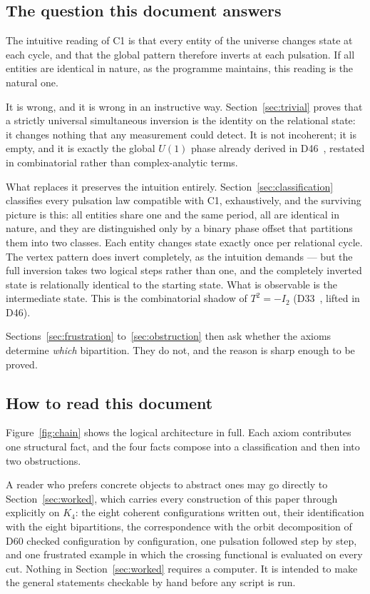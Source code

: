 \documentclass[11pt,a4paper]{article}
\def\mathrm#1{#1}%
\newcommand{\Kfour}{K_4}
\begin{document}
\subsection{The question this document answers}

The intuitive reading of C1 is that every entity of the universe changes state at each cycle, and that the global pattern therefore inverts at each pulsation. If all entities are identical in nature, as the programme maintains, this reading is the natural one.

It is wrong, and it is wrong in an instructive way. Section~\ref{sec:trivial} proves that a strictly universal simultaneous inversion is the identity on the relational state: it changes nothing that any measurement could detect. It is not incoherent; it is empty, and it is exactly the global $\mathrm{U}(1)$ phase already derived in D46~\citep{D46}, restated in combinatorial rather than complex-analytic terms.

What replaces it preserves the intuition entirely. Section~\ref{sec:classification} classifies every pulsation law compatible with C1, exhaustively, and the surviving picture is this: all entities share one and the same period, all are identical in nature, and they are distinguished only by a binary phase offset that partitions them into two classes. Each entity changes state exactly once per relational cycle. The vertex pattern does invert completely, as the intuition demands --- but the full inversion takes two logical steps rather than one, and the completely inverted state is relationally identical to the starting state. What is observable is the intermediate state. This is the combinatorial shadow of $T^2=-I_2$ (D33~\citep{D33}, lifted in D46).

Sections~\ref{sec:frustration} to~\ref{sec:obstruction} then ask whether the axioms determine \emph{which} bipartition. They do not, and the reason is sharp enough to be proved.

\subsection{How to read this document}

Figure~\ref{fig:chain} shows the logical architecture in full. Each axiom contributes one structural fact, and the four facts compose into a classification and then into two obstructions.

A reader who prefers concrete objects to abstract ones may go directly to Section~\ref{sec:worked}, which carries every construction of this paper through explicitly on $\Kfour$: the eight coherent configurations written out, their identification with the eight bipartitions, the correspondence with the orbit decomposition of D60 checked configuration by configuration, one pulsation followed step by step, and one frustrated example in which the crossing functional is evaluated on every cut. Nothing in Section~\ref{sec:worked} requires a computer. It is intended to make the general statements checkable by hand before any script is run.
\end{document}
